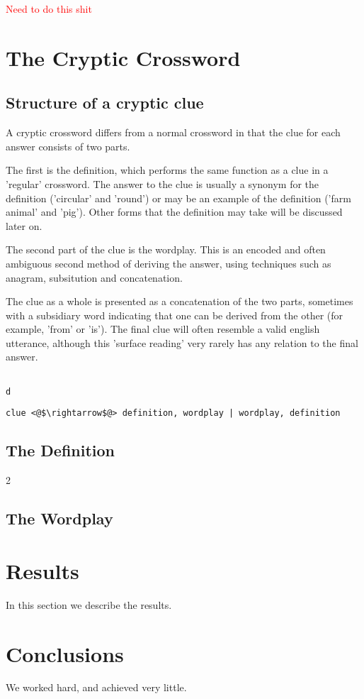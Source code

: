 \documentclass[12pt]{article}
\newcommand\todo[1]{\textcolor{red}{#1}}
\begin{document}
\todo {Need to do this shit}


\section{The Cryptic Crossword}

\subsection{Structure of a cryptic clue}
A cryptic crossword differs from a normal crossword in that the clue for each answer consists of two parts. 

The first is the definition, which performs the same function as a clue in a 'regular' crossword. The answer to the clue is usually a synonym for the definition ('circular' and 'round') or may be an example of the definition ('farm animal' and 'pig'). Other forms that the definition may take will be discussed later on.

The second part of the clue is the wordplay. This is an encoded and often ambiguous second method of deriving the answer, using techniques such as anagram, subsitution and concatenation. 

The clue as a whole is presented as a concatenation of the two parts, sometimes with a subsidiary word indicating that one can be derived from the other (for example, 'from' or 'is'). The final clue will often resemble a valid english utterance, although this 'surface reading' very rarely has any relation to the final answer.

\begin{verbatim}

d
\end{verbatim}

\begin{lstlisting}
clue <@$\rightarrow$@> definition, wordplay | wordplay, definition
\end{lstlisting}



\subsection{The Definition}



2\subsection{The Wordplay}


\section{Results}\label{results}
In this section we describe the results.

\section{Conclusions}\label{conclusions}
We worked hard, and achieved very little.



\end{document}
